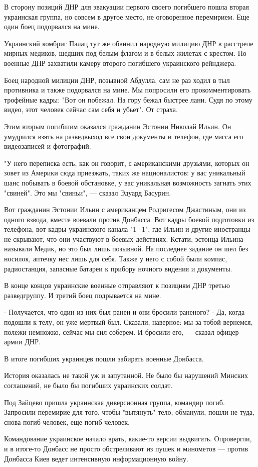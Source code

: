 В сторону позиций ДНР для эвакуации первого своего погибшего пошла вторая
украинская группа, но совсем в другое место, не оговоренное перемирием. Еще
один боец подорвался на мине.

Украинский комбриг Палац тут же обвинил народную милицию ДНР в расстреле мирных
медиков, шедших под белым флагом и в белых жилетах с крестом. Но военные ДНР
захватили камеру второго погибшего украинского рейнджера.

Боец народной милиции ДНР, позывной Абдулла, сам не раз ходил в тыл противника
и также подорвался на мине. Мы попросили его прокомментировать трофейные кадры:
"Вот он побежал. На гору бежал быстрее лани. Судя по этому видео, этот человек
сейчас сам себя и убьет". От страха.

Этим вторым погибшим оказался гражданин Эстонии Николай Ильин. Он умудрился
взять на разведвыход все свои документы и телефон, где масса его видеозаписей и
фотографий.

"У него переписка есть, как он говорит, с американскими друзьями, которых он
зовет из Америки сюда приезжать, таких же националистов: у вас уникальный шанс
побывать в боевой обстановке, у вас уникальная возможность загнать этих
"свиней". Это мы "свиньи", --- сказал Эдуард Басурин.

Вот гражданин Эстонии Ильин с американцем Родригесом Джастиным, они из одного
взвода, вместе воевали против Донбасса. Вот кадры боевой подготовки из
телефона, вот кадры украинского канала "1+1", где Ильин и другие иностранцы не
скрывают, что они участвуют в боевых действиях. Кстати, эстонца Ильина называли
Медик, но это был лишь позывной. На последнее задание он шел без носилок,
аптечку нес лишь для себя. Также у него с собой были компас, радиостанция,
запасные батареи к прибору ночного видения и документы.

В конце концов украинские военные отправляют к позициям ДНР третью
разведгруппу. И третий боец подрывается на мине.

- Получается, что один из них был ранен и они бросили раненого?  - Да, когда
подошли к телу, он уже мертвый был. Сказали, наверное: мы за тобой вернемся,
полежи немножко, сейчас мы сил соберем. И бросили его, --- сказал офицер армии
ДНР.

В итоге погибших украинцев пошли забирать военные Донбасса.

История оказалась не такой уж и запутанной. Не было бы нарушений Минских
соглашений, не было бы погибших украинских солдат.

Под Зайцево пришла украинская диверсионная группа, командир погиб. Запросили
перемирие для того, чтобы "вытянуть" тело, обманули, пошли не туда, снова погиб
человек, еще погиб человек. 

Командование украинское начало врать, какие-то версии выдвигать. Опровергли, и
в итоге-то Донбасс не просто обстреливают из пушек и минометов --- против
Донбасса Киев ведет интенсивную информационную войну.
  
